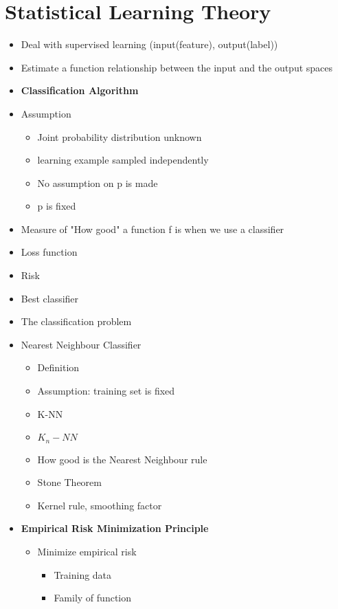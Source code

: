 \chapter{Statistical Learning Theory}
\begin{itemize}
    \item Deal with supervised learning (input(feature), output(label))
    \item Estimate a function relationship between the input and the output spaces
    \item \textbf{Classification Algorithm}
    \item Assumption
    \begin{itemize}
        \item Joint probability distribution unknown
        \item learning example sampled independently
        \item No assumption on p is made
        \item p is fixed
    \end{itemize}
    \item Measure of "How good" a function f is when we use a classifier
    \item Loss function 
    \item Risk
    \item Best classifier
    \item The classification problem
    \item Nearest Neighbour Classifier
    \begin{itemize}
        \item Definition
        \item Assumption: training set is fixed
        \item K-NN
        \item \(K_n-NN\)
        \item How good is the Nearest Neighbour rule
        \item Stone Theorem
        \item Kernel rule, smoothing factor
    \end{itemize}
    \item \textbf{Empirical Risk Minimization Principle}
    \begin{itemize}
        \item Minimize empirical risk
        \begin{itemize}
            \item Training data
            \item Family of function

\end{itemize}
\end{itemize}
\end{itemize}

